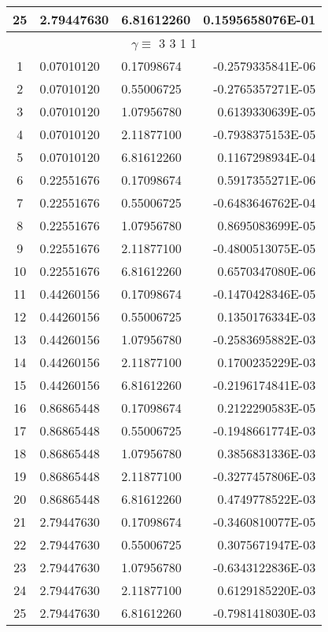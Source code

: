 \begin{longtable}{@{\extracolsep{\fill}}cllr@{}}
25  &  2.79447630  &  6.81612260  &   0.1595658076E-01 \\
\midrule
\multicolumn{4}{c}{ $\gamma \equiv $  3 3 1 1} \\
\midrule
1  &  0.07010120  &  0.17098674  &  -0.2579335841E-06 \\
2  &  0.07010120  &  0.55006725  &  -0.2765357271E-05 \\
3  &  0.07010120  &  1.07956780  &   0.6139330639E-05 \\
4  &  0.07010120  &  2.11877100  &  -0.7938375153E-05 \\
5  &  0.07010120  &  6.81612260  &   0.1167298934E-04 \\
6  &  0.22551676  &  0.17098674  &   0.5917355271E-06 \\
7  &  0.22551676  &  0.55006725  &  -0.6483646762E-04 \\
8  &  0.22551676  &  1.07956780  &   0.8695083699E-05 \\
9  &  0.22551676  &  2.11877100  &  -0.4800513075E-05 \\
10  &  0.22551676  &  6.81612260  &   0.6570347080E-06 \\
11  &  0.44260156  &  0.17098674  &  -0.1470428346E-05 \\
12  &  0.44260156  &  0.55006725  &   0.1350176334E-03 \\
13  &  0.44260156  &  1.07956780  &  -0.2583695882E-03 \\
14  &  0.44260156  &  2.11877100  &   0.1700235229E-03 \\
15  &  0.44260156  &  6.81612260  &  -0.2196174841E-03 \\
16  &  0.86865448  &  0.17098674  &   0.2122290583E-05 \\
17  &  0.86865448  &  0.55006725  &  -0.1948661774E-03 \\
18  &  0.86865448  &  1.07956780  &   0.3856831336E-03 \\
19  &  0.86865448  &  2.11877100  &  -0.3277457806E-03 \\
20  &  0.86865448  &  6.81612260  &   0.4749778522E-03 \\
21  &  2.79447630  &  0.17098674  &  -0.3460810077E-05 \\
22  &  2.79447630  &  0.55006725  &   0.3075671947E-03 \\
23  &  2.79447630  &  1.07956780  &  -0.6343122836E-03 \\
24  &  2.79447630  &  2.11877100  &   0.6129185220E-03 \\
25  &  2.79447630  &  6.81612260  &  -0.7981418030E-03 \\
\end{longtable}

